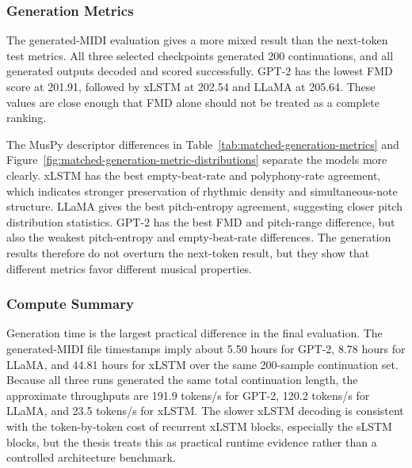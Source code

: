 \subsubsection{Generation Metrics}

The generated-MIDI evaluation gives a more mixed result than the next-token
test metrics. All three selected checkpoints generated 200 continuations, and
all generated outputs decoded and scored successfully. GPT-2 has the lowest FMD
score at 201.91, followed by xLSTM at 202.54 and LLaMA at 205.64. These values
are close enough that FMD alone should not be treated as a complete ranking.

The MusPy descriptor differences in
Table~\ref{tab:matched-generation-metrics} and
Figure~\ref{fig:matched-generation-metric-distributions} separate the models
more clearly. xLSTM has the best empty-beat-rate and polyphony-rate agreement,
which indicates stronger preservation of rhythmic density and simultaneous-note
structure. LLaMA gives the best pitch-entropy agreement, suggesting closer pitch
distribution statistics. GPT-2 has the best FMD and pitch-range difference, but
also the weakest pitch-entropy and empty-beat-rate differences. The generation
results therefore do not overturn the next-token result, but they show that
different metrics favor different musical properties.

\subsubsection{Compute Summary}

Generation time is the largest practical difference in the final evaluation.
The generated-MIDI file timestamps imply about 5.50 hours for GPT-2, 8.78 hours
for LLaMA, and 44.81 hours for xLSTM over the same 200-sample continuation set.
Because all three runs generated the same total continuation length, the
approximate throughputs are 191.9 tokens/s for GPT-2, 120.2 tokens/s for LLaMA,
and 23.5 tokens/s for xLSTM. The slower xLSTM decoding is consistent with the
token-by-token cost of recurrent xLSTM blocks, especially the sLSTM blocks, but
the thesis treats this as practical runtime evidence rather than a controlled
architecture benchmark.

